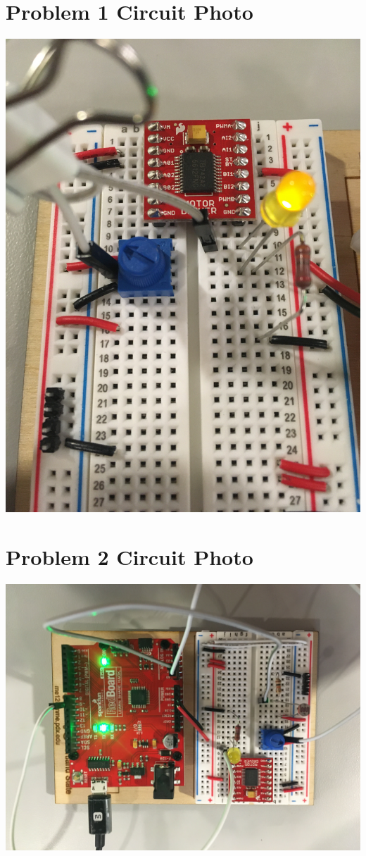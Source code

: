 \documentclass{article}
\begin{document}
\pagebreak
\begin{center}
\section*{Problem 1 Circuit Photo}
\includegraphics[scale=.08]{p2.jpg}
\section*{Problem 2 Circuit Photo}
\includegraphics[scale=.08]{p3.jpg}

\end{center}
\end{document}
